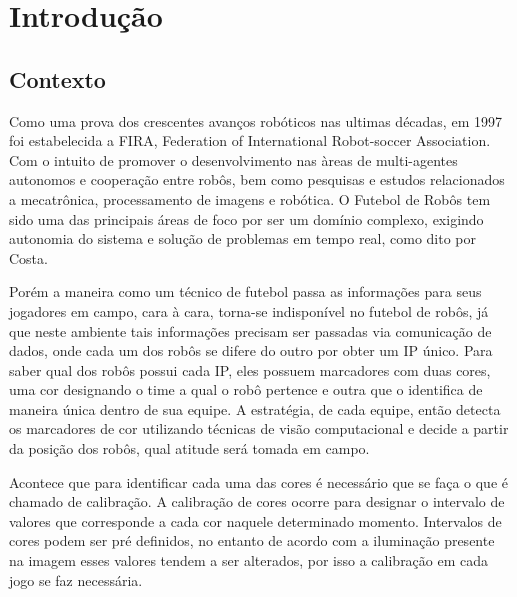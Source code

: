 \chapter{Introdução} \label{Cap:Introducao}
\section{Contexto}
Como uma prova dos crescentes avanços robóticos nas ultimas décadas, em 1997 foi estabelecida a FIRA\cite{FiraHistory}, Federation of International Robot-soccer Association. Com o intuito de promover o desenvolvimento nas àreas de multi-agentes autonomos e cooperação entre robôs, bem como pesquisas e estudos relacionados a mecatrônica, processamento de imagens e robótica\cite{FiraOverview}. O Futebol de Robôs tem sido  uma das principais áreas de foco por ser um domínio complexo, exigindo autonomia do sistema e solução de problemas em tempo real, como dito por Costa\cite{Costa:2000}. 

Porém a maneira como um técnico de futebol passa as informações para seus jogadores em campo, cara à cara, torna-se indisponível no futebol de robôs, já que neste ambiente tais informações precisam ser passadas via comunicação de dados, onde cada um dos robôs se difere do outro por obter um IP único. Para saber qual dos robôs possui cada IP, eles possuem marcadores com duas cores, uma cor designando o time a qual o robô pertence e outra que o identifica de maneira única dentro de sua equipe. A estratégia, de cada equipe, então detecta os marcadores de cor utilizando técnicas de visão computacional e decide a partir da posição dos robôs, qual atitude será tomada em campo.

Acontece que para identificar cada uma das cores é necessário que se faça o que é chamado de calibração. A calibração de cores ocorre para designar o intervalo de valores que corresponde a cada cor naquele determinado momento. Intervalos de cores podem ser pré definidos, no entanto de acordo com a iluminação presente na imagem esses valores tendem a ser alterados, por isso a calibração em cada jogo se faz necessária.
